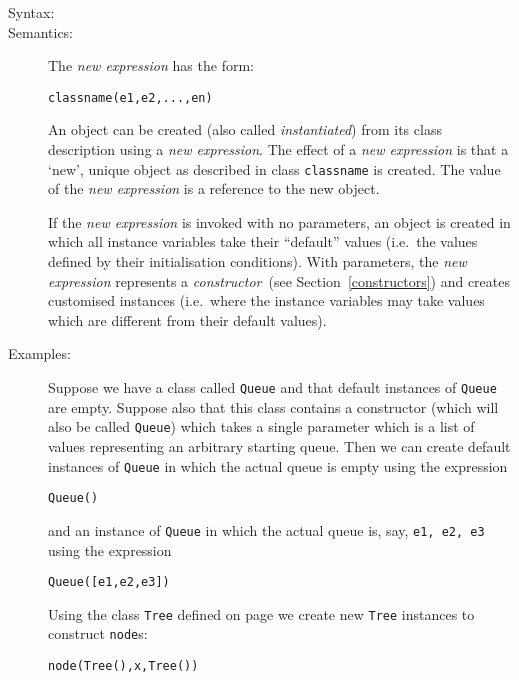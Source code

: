 \documentclass[\pformat,12pt]{article}
\begin{document}
\begin{description}
\item[Syntax:] 

\item[Semantics:] The {\it new expression} has the form:

  \begin{alltt}
     classname(e1, e2, ..., en)
  \end{alltt}
  An object can be created (also called {\em instantiated}) from its
  class description using a {\it new expression}. The effect of a
  {\it new expression} is that a `new', unique object as described in
  class {\tt classname} is created. The value of the {\it new
  expression} is a reference to the new object.

  If the {\it new expression} is invoked with no parameters, an
  object is created in which all instance variables take their
  ``default'' values (i.e.\ the values defined by their initialisation
  conditions). With parameters, the {\it new expression} represents a
  \emph{constructor}~(see Section~\ref{constructors}) and creates
  customised instances (i.e.\ where the instance variables may take
  values which are different from their default values).


\item[Examples:] Suppose we have a class called \texttt{Queue} and
  that default instances of \texttt{Queue} are empty. Suppose also
  that this class contains a constructor (which will also be called
  \texttt{Queue}) which takes a single parameter which is a list of
  values representing an arbitrary starting queue. Then we can 
  create default  instances of \texttt{Queue} in which the actual
  queue is empty using the expression
\begin{alltt}
   Queue()
\end{alltt}
and an instance of \texttt{Queue} in which the actual
  queue is, say, \texttt{e1, e2, e3} using the expression
\begin{alltt}
   Queue([e1, e2, e3])
\end{alltt}

Using the class \texttt{Tree} defined on page \pageref{TreeDef} we create
new \texttt{Tree} instances to construct \texttt{node}s:
\begin{alltt}
node( Tree(), x,  Tree())
\end{alltt}
    

\end{description}
\end{document}
